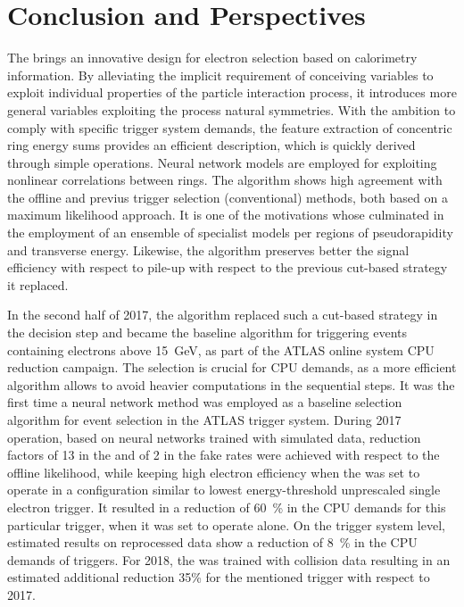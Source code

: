 \chapter{Conclusion and Perspectives}\label{sec:conclusion}


The \rnn{} brings an innovative design for electron selection based on
calorimetry information. By alleviating the implicit requirement of conceiving
variables to exploit individual properties of the particle interaction process, it introduces 
more general variables exploiting the process natural symmetries. With the
ambition to comply with specific trigger system demands, the feature extraction
of concentric ring energy sums provides an efficient description, which is quickly derived
through simple operations. Neural network models are employed for exploiting
nonlinear correlations between rings. The algorithm shows
high agreement with the offline and previus trigger selection (conventional) methods, both based
on a maximum likelihood approach. It is one of the motivations whose culminated
in the employment of an ensemble of specialist models per regions of
pseudorapidity and transverse energy. Likewise, the \rnn{} algorithm preserves
better the signal efficiency with respect to pile-up with respect to the
previous cut-based strategy it replaced.



In the second half of 2017, the \rnn{} algorithm replaced such a cut-based strategy
in the \fastcalo{} decision step and became the baseline algorithm
for triggering events containing electrons above \SI{15}{\GeV}, as part of the ATLAS online system CPU reduction campaign. The \fastcalo{} selection is crucial for CPU demands, as a more
efficient algorithm allows to avoid heavier computations in the
sequential steps.  It was the first time a neural network method was employed as
a baseline selection algorithm for event selection in the ATLAS trigger system.
During 2017 operation, based on neural networks trained with simulated data,
reduction factors of 13 in the \fastcalo{} and of 2 in
the \hlt{} fake rates were achieved with respect to the offline likelihood, while
keeping high electron efficiency when the \rnn{} was set to operate in a
configuration similar to lowest energy-threshold unprescaled single electron
trigger. It resulted in a reduction of \SI{60}{\%} in the CPU demands for this particular trigger, when it was set to operate alone. On the trigger system level,
estimated results on reprocessed data show a reduction of \SI{8}{\%} in the CPU
demands of \egamma{} triggers. For 2018, the \rnn{} was trained with collision
data resulting in an estimated additional reduction 35\% for the
mentioned trigger with respect to 2017.

